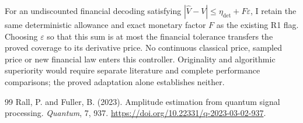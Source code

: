 \documentclass[11pt]{article}
\begin{document}
For an undiscounted financial decoding satisfying
$|\widehat V-V|\leq\eta_{\mathrm{det}}+F\varepsilon$, I retain the
same deterministic allowance and exact monetary factor $F$ as the
existing R1 flag. Choosing $\varepsilon$ so that this sum is at most
the financial tolerance transfers the proved coverage to its derivative
price. No continuous classical price, sampled price or new financial
law enters this controller. Originality and algorithmic superiority
would require separate literature and complete performance comparisons;
the proved adaptation alone establishes neither.

\begin{thebibliography}{99}
 Rall, P. and Fuller, B. (2023). Amplitude estimation from quantum signal processing. \emph{Quantum}, 7, 937. \url{https://doi.org/10.22331/q-2023-03-02-937}.
\end{thebibliography}
\end{document}
